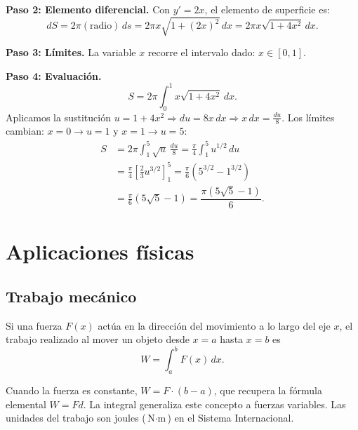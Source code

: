 \begin{example}
\begin{myproof}
\textbf{Paso 2: Elemento diferencial.}
Con $y'=2x$, el elemento de superficie es:
\[
  dS = 2\pi (\text{radio})\,ds = 2\pi x \sqrt{1+(2x)^2}\,dx = 2\pi x \sqrt{1+4x^2}\,dx.
\]

\textbf{Paso 3: Límites.}
La variable $x$ recorre el intervalo dado: $x\in[0,1]$.

\textbf{Paso 4: Evaluación.}
\[
  S = 2\pi\int_0^1 x\sqrt{1+4x^2}\,dx.
\]
Aplicamos la sustitución $u=1+4x^2 \Rightarrow du=8x\,dx \Rightarrow x\,dx=\frac{du}{8}$.
Los límites cambian: $x=0 \to u=1$ y $x=1 \to u=5$:
\begin{align*}
  S &= 2\pi\int_1^5 \sqrt{u}\,\frac{du}{8}
     = \frac{\pi}{4}\int_1^5 u^{1/2}\,du \\
    &= \frac{\pi}{4}\left[\frac{2}{3}u^{3/2}\right]_1^5
     = \frac{\pi}{6}\left(5^{3/2}-1^{3/2}\right) \\
    &= \frac{\pi}{6}\left(5\sqrt{5}-1\right)
     = \boxed{\dfrac{\pi(5\sqrt{5}-1)}{6}}.
\end{align*}
\end{myproof}
\end{example}



\section{Aplicaciones físicas}

\subsection{Trabajo mecánico}

\begin{definition}
Si una fuerza $F(x)$ actúa en la dirección del movimiento a lo largo del
eje $x$, el trabajo realizado al mover un objeto desde $x=a$ hasta $x=b$
es
\[
  W = \int_a^b F(x)\,dx.
\]
\end{definition}

\begin{rem}
Cuando la fuerza es constante, $W=F\cdot(b-a)$, que recupera la fórmula
elemental $W=Fd$. La integral generaliza este concepto a fuerzas variables.
Las unidades del trabajo son joules ($\text{N}\cdot\text{m}$) en el
Sistema Internacional.
\end{rem}

